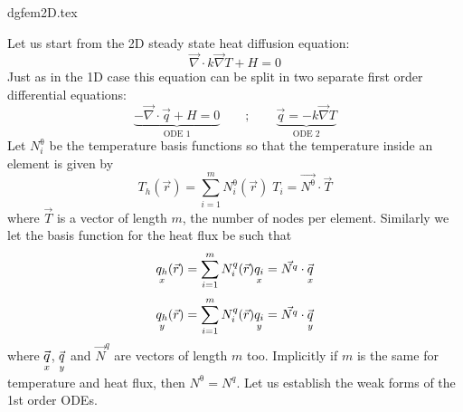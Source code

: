 \begin{flushright} {\tiny {\color{gray} dgfem2D.tex}} \end{flushright}

Let us start from the 2D steady state heat diffusion equation:
\begin{equation}
\vec{\nabla} \cdot k \vec{\nabla} T + H=0
\end{equation}
Just as in the 1D case this equation can be split in two separate first order differential equations:
\begin{equation}
\underbrace{-\vec{\nabla}\cdot \vec{q} + H=0}_{\text{ODE 1}} \qquad 
; \qquad \underbrace{\vec{q}=-k\vec{\nabla } T}_{\text{ODE 2}}
\end{equation}
Let $N^\uptheta_i$ be the temperature basis functions so that the temperature inside an element is given by
\begin{equation}
T_h (\vec{r}) = \sum_{i=1}^m N_i^\uptheta (\vec{r}) \; T_i = \vec{N^\uptheta}\cdot \vec{T}
\end{equation}
where $\vec{T}$ is a vector of length $m$, the number of nodes per element. 
Similarly we let the basis function for the heat flux be such that 
\begin{equation}
\underset{\tiny x}{q_h}(\vec{r}) = \sum_{i=1}^m N_i^q (\vec r) \underset{\tiny x}{q_i} = \vec{N^q}\cdot \vec{\underset{\tiny x}{q}}
\end{equation}
\begin{equation}
\underset{\tiny y}{q_h}(\vec{r}) = \sum_{i=1}^m N_i^q (\vec r) \underset{\tiny y}{q_i} = \vec{N^q}\cdot \vec{\underset{\tiny y}{q}}
\end{equation}
where $\vec{\underset{\tiny x}{q}}$, $\vec{\underset{\tiny y}{q}}$ and $\vec{N}^q$ 
are vectors of length $m$ too. Implicitly if $m$ is the same for temperature and heat 
flux, then $N^\uptheta = N^q$.
Let us establish the weak forms of the 1st order ODEs. 

